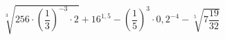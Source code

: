 \begin{ex}[type=calculate]
	\begin{condition}
		\( \sqrt[3]{256\cdot\left( \dfrac{1}{3} \right)^{-3}\cdot2}+16^{1,5}-\left( \dfrac{1}{5} \right)^3\cdot0,2^{-4}-\sqrt[5]{7\dfrac{19}{32}} \)
	\end{condition}
\end{ex}